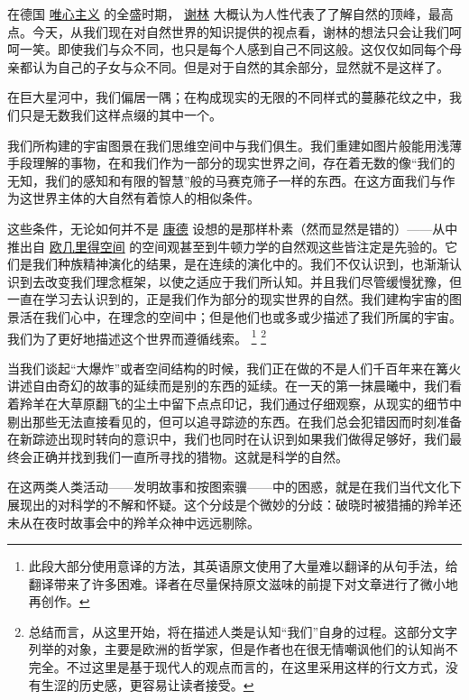     在德国
\href{http://toyhouse.cc/wiki/index.php/唯心主义}{唯心主义}
的全盛时期，
\href{http://toyhouse.cc/wiki/index.php/谢林}{谢林}
大概认为人性代表了了解自然的顶峰，最高点。今天，从我们现在对自然世界的知识提供的视点看，谢林的想法只会让我们呵呵一笑。即使我们与众不同，也只是每个人感到自己不同这般。这仅仅如同每个母亲都认为自己的子女与众不同。但是对于自然的其余部分，显然就不是这样了。

    在巨大星河中，我们偏居一隅；在构成现实的无限的不同样式的蔓藤花纹之中，我们只是无数我们这样点缀的其中一个。

    我们所构建的宇宙图景在我们思维空间中与我们俱生。我们重建如图片般能用浅薄手段理解的事物，在和我们作为一部分的现实世界之间，存在着无数的像“我们的无知，我们的感知和有限的智慧”般的马赛克筛子一样的东西。在这方面我们与作为这世界主体的大自然有着惊人的相似条件。

    这些条件，无论如何并不是
\href{http://toyhouse.cc/wiki/index.php/康德}{康德}
设想的是那样朴素（然而显然是错的）——从中推出自
\href{http://toyhouse.cc/wiki/index.php/欧几里得空间}{欧几里得空间}
的空间观甚至到牛顿力学的自然观这些皆注定是先验的。它们是我们种族精神演化的结果，是在连续的演化中的。我们不仅认识到，也渐渐认识到去改变我们理念框架，以使之适应于我们所认知。并且我们尽管缓慢犹豫，但一直在学习去认识到的，正是我们作为部分的现实世界的自然。我们建构宇宙的图景活在我们心中，在理念的空间中；但是他们也或多或少描述了我们所属的宇宙。我们为了更好地描述这个世界而遵循线索。
\footnote[2]
{
此段大部分使用意译的方法，其英语原文使用了大量难以翻译的从句手法，给翻译带来了许多困难。译者在尽量保持原文滋味的前提下对文章进行了微小地再创作。
}
\footnote[3]
{
总结而言，从这里开始，将在描述人类是认知“我们”自身的过程。这部分文字列举的对象，主要是欧洲的哲学家，但是作者也在很无情嘲讽他们的认知尚不完全。不过这里是基于现代人的观点而言的，在这里采用这样的行文方式，没有生涩的历史感，更容易让读者接受。
}

    当我们谈起“大爆炸”或者空间结构的时候，我们正在做的不是人们千百年来在篝火讲述自由奇幻的故事的延续而是别的东西的延续。在一天的第一抹晨曦中，我们看着羚羊在大草原翻飞的尘土中留下点点印记，我们通过仔细观察，从现实的细节中剔出那些无法直接看见的，但可以追寻踪迹的东西。在我们总会犯错因而时刻准备在新踪迹出现时转向的意识中，我们也同时在认识到如果我们做得足够好，我们最终会正确并找到我们一直所寻找的猎物。这就是科学的自然。

    在这两类人类活动——发明故事和按图索骥——中的困惑，就是在我们当代文化下展现出的对科学的不解和怀疑。这个分歧是个微妙的分歧：破晓时被猎捕的羚羊还未从在夜时故事会中的羚羊众神中远远剔除。

